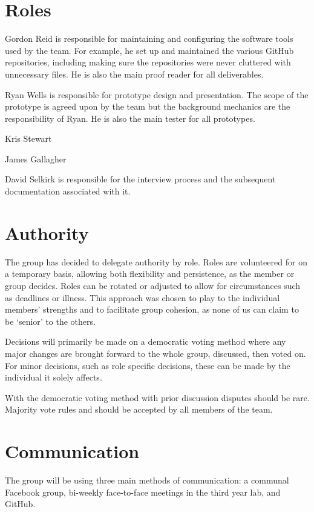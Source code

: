\documentclass{l3deliverable}
\begin{document}
\pagebreak

\section{Roles}

Gordon Reid is responsible for maintaining and configuring the software tools
used by the team. For example, he set up and maintained the various GitHub
repositories, including making sure the repositories were never cluttered
with unnecessary files. He is also the main proof reader for all
deliverables.

Ryan Wells is responsible for prototype design and presentation. The scope
of the prototype is agreed upon by the team but the background mechanics
are the responsibility of Ryan. He is also the main tester for all prototypes.

Kris Stewart

James Gallagher

David Selkirk is responsible for the interview process and the subsequent 
documentation associated with it.

\section{Authority}

The group has decided to delegate authority by role. Roles are volunteered for
on a temporary basis, allowing both flexibility and persistence, as the
member or group decides. Roles can be rotated or adjusted to allow for
circumstances such as deadlines or illness. This approach was chosen to play
to the individual members' strengths and to facilitate group cohesion, as none
of us can claim to be `senior' to the others.

Decisions will primarily be made on a democratic voting method where any
major changes are brought forward to the whole group, discussed, then voted
on. For minor decisions, such as role specific decisions, these can be made
by the individual it solely affects.

With the democratic voting method with prior discussion disputes should be
rare. Majority vote rules and should be accepted by all members of the team.

\section{Communication}
\label{sec:com}

The group will be using three main methods of communication: a communal
Facebook group, bi-weekly face-to-face meetings in the third year lab,
and GitHub.
\end{document}
